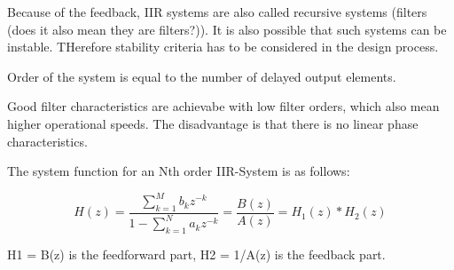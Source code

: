 Because of the feedback, IIR systems are also called recursive systems (filters (does it also mean they are filters?)). It is also possible that such systems can be instable. THerefore stability criteria has to be considered in the design process.

Order of the system is equal to the number of delayed output elements.

Good filter characteristics are achievabe with low filter orders, which also mean higher operational speeds. The disadvantage is that there is no linear phase characteristics.

The system function for an Nth order IIR-System is as follows:

$$
\boxed{H(z) = \frac{\displaystyle \sum_{k=1}^{M}b_kz^{-k}}{\displaystyle 1-\sum_{k=1}^{N}a_kz^{-k}} = \frac{B(z)}{A(z)} = H_1(z)*H_2(z)}
$$

H1 = B(z) is the feedforward part, H2 = 1/A(z) is the feedback part.
